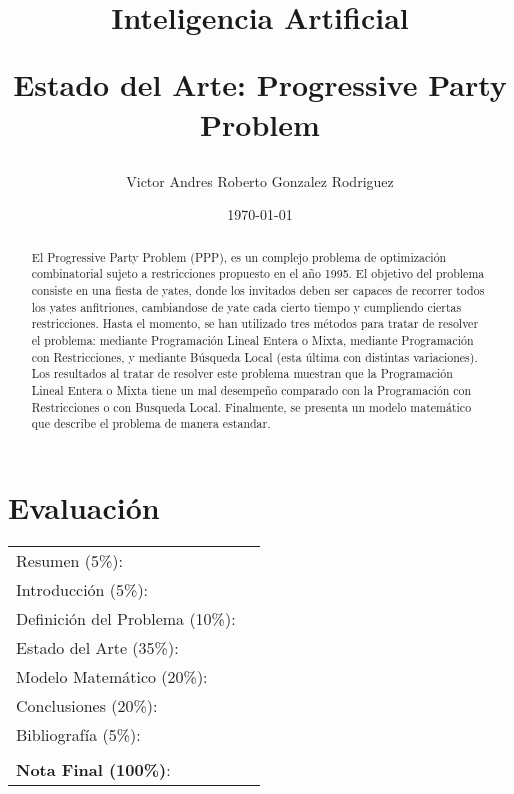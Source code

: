\documentclass[letter, 10pt]{article}
\begin{document}
\title{Inteligencia Artificial \\ \begin{Large}Estado del Arte: Progressive Party Problem\end{Large}}
\author{Victor Andres Roberto Gonzalez Rodriguez}
\date{\today}
\maketitle


\section*{Evaluación}

\begin{tabular}{ll}
Resumen (5\%): & \underline{\hspace{2cm}} \\
Introducción (5\%):  & \underline{\hspace{2cm}} \\
Definición del Problema (10\%):  & \underline{\hspace{2cm}} \\
Estado del Arte (35\%):  & \underline{\hspace{2cm}} \\
Modelo Matemático (20\%): &  \underline{\hspace{2cm}}\\
Conclusiones (20\%): &  \underline{\hspace{2cm}}\\
Bibliografía (5\%): & \underline{\hspace{2cm}}\\
 &  \\
\textbf{Nota Final (100\%)}:   & \underline{\hspace{2cm}}
\end{tabular}
\vspace{2cm}


\begin{abstract}
El Progressive Party Problem (PPP), es un complejo problema de optimización combinatorial sujeto a restricciones propuesto en el año 1995. El objetivo del problema consiste en una fiesta de yates, donde los invitados deben ser capaces de recorrer todos los yates anfitriones, cambiandose de yate cada cierto tiempo y cumpliendo ciertas restricciones. Hasta el momento, se han utilizado tres métodos para tratar de resolver el problema: mediante Programación Lineal Entera o Mixta, mediante Programación con Restricciones, y mediante Búsqueda Local (esta última con distintas variaciones). Los resultados al tratar de resolver este problema muestran que la Programación Lineal Entera o Mixta tiene un mal desempeño comparado con la Programación con Restricciones o con Busqueda Local. Finalmente, se presenta un modelo matemático que describe el problema de manera estandar.
\end{abstract}
\end{document}
